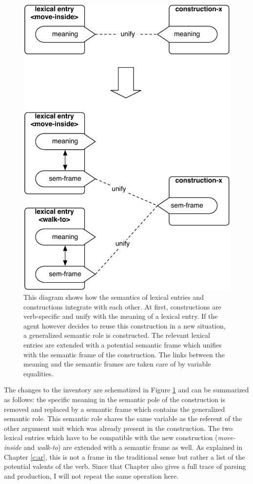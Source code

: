 \begin{figure}[htp]
\centerline{\includegraphics[width=0.7\linewidth]{Chapter3/figs/generalise}}
  \caption[Constructing generalized semantic roles]{This diagram shows how the semantics of lexical entries and constructions integrate with each other. At first, constructions are verb-specific and unify with the meaning of a lexical entry. If the agent however decides to reuse this construction in a new situation, a generalized semantic role is constructed. The relevant lexical entries are extended with a potential semantic frame which unifies with the semantic frame of the construction. The links between the meaning and the semantic frames are taken care of by variable equalities.}
   \label{f:generalise}
\end{figure}

The changes to the inventory are schematized in Figure \ref{f:generalise} and can be summarized as follows: the specific meaning in the semantic pole of the construction is removed and replaced by a semantic frame which contains the generalized semantic role. This semantic role shares the same variable as the referent of the other argument unit which was already present in the construction. The two lexical entries which have to be compatible with the new construction ({\em move-inside} and {\em walk-to}) are extended with a semantic frame as well. As explained in Chapter \ref{c:ar}, this is not a frame in the traditional sense but rather a list of the potential valents of the verb. Since that Chapter also gives a full trace of parsing and production, I will not repeat the same operation here.


